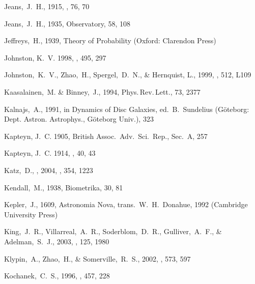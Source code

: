 \begin{thebibliography}{99}
  Jeans,~J.~H., 1915,
  \mnras, 76, 70

  Jeans,~J.~H., 1935,
  Observatory, 58, 108

  Jeffreys,~H., 1939,
  Theory of Probability (Oxford: Clarendon Press)

{Johnston}, K.~V. 1998, \apj, 495, 297

  Johnston,~K.~V., Zhao,~H., Spergel,~D.~N., \& Hernquist, L., 1999,
  \apjl, 512, L109 

  Kaasalainen,~M. \& Binney,~J., 1994,
  Phys.\,Rev.\,Lett., 73, 2377

  Kalnajs,~A., 1991, in Dynamics of Disc Galaxies, ed.~B.~Sundelius (G\"{o}teborg: Dept. Astron. Astrophys., G\"{o}teborg Univ.), 323

{Kapteyn}, J.~C. 1905, {British Assoc.~Adv.~Sci.~Rep.}, Sec.~A, 257

{Kapteyn}, J.~C. 1914, \apj, 40, 43

  Katz,~D., \etal, 2004,
\mnras, 354, 1223

  Kendall,~M., 1938,
  Biometrika, 30, 81

  Kepler,~J., 1609,
  Astronomia Nova,
  trans.\ W.~H.~Donahue, 1992
  (Cambridge University Press)

  King,~J.~R., Villarreal,~A.~R., Soderblom,~D.~R., Gulliver,~A.~F., \& Adelman,~S.~J., 2003,
  \aj, 125, 1980

  Klypin,~A., Zhao,~H., \& Somerville,~R.~S., 2002,
  \apj, 573, 597

  Kochanek,~C.~S., 1996,
  \apj, 457, 228


\end{thebibliography}
